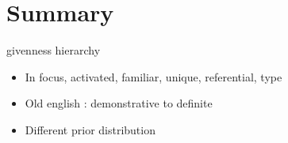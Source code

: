 \documentclass[12pt]{upenndiss}
\theoremstyle{definition} \newtheorem{definition}{Definition}
\begin{document}
\section{Summary}

givenness hierarchy

\begin{itemize}
	\item In focus, activated, familiar, unique, referential, type
	\item Old english : demonstrative to definite
	\item Different prior distribution 
\end{itemize}





\end{document}
